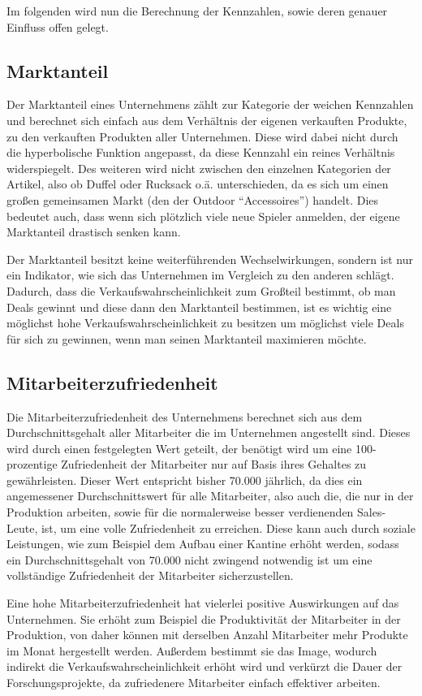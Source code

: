 Im folgenden wird nun die Berechnung der Kennzahlen, sowie deren genauer Einfluss offen gelegt.  

\subsection{Marktanteil} 
Der Marktanteil eines Unternehmens zählt zur Kategorie der weichen Kennzahlen und berechnet sich einfach aus dem Verhältnis der eigenen verkauften Produkte, zu den verkauften Produkten aller Unternehmen. Diese wird dabei nicht durch die hyperbolische Funktion angepasst, da diese Kennzahl ein reines Verhältnis widerspiegelt. Des weiteren wird nicht zwischen den einzelnen Kategorien der Artikel, also ob Duffel oder Rucksack o.ä. unterschieden, da es sich um einen großen gemeinsamen Markt (den der Outdoor \enquote{Accessoires}) handelt. Dies bedeutet auch, dass wenn sich plötzlich viele neue Spieler anmelden, der eigene Marktanteil drastisch senken kann. 

Der Marktanteil besitzt keine weiterführenden Wechselwirkungen, sondern ist nur ein Indikator, wie sich das Unternehmen im Vergleich zu den anderen schlägt. Dadurch, dass die Verkaufswahrscheinlichkeit zum Großteil bestimmt, ob man Deals gewinnt und diese dann den Marktanteil bestimmen, ist es wichtig eine möglichst hohe Verkaufswahrscheinlichkeit zu besitzen um möglichst viele Deals für sich zu gewinnen, wenn man seinen Marktanteil maximieren möchte. 

\subsection{Mitarbeiterzufriedenheit}
Die Mitarbeiterzufriedenheit des Unternehmens berechnet sich aus dem Durchschnittsgehalt aller Mitarbeiter die im Unternehmen angestellt sind. Dieses wird durch einen festgelegten Wert geteilt, der benötigt wird um eine 100-prozentige Zufriedenheit der Mitarbeiter nur auf Basis ihres Gehaltes zu gewährleisten. Dieser Wert entspricht bisher 70.000\€ jährlich, da dies ein angemessener Durchschnittswert für alle Mitarbeiter, also auch die, die nur in der Produktion arbeiten, sowie für die normalerweise besser verdienenden Sales-Leute, ist, um eine volle Zufriedenheit zu erreichen. Diese kann auch durch soziale Leistungen, wie zum Beispiel dem Aufbau einer Kantine erhöht werden, sodass ein Durchschnittsgehalt von 70.000\€ nicht zwingend notwendig ist um eine vollständige Zufriedenheit der Mitarbeiter sicherzustellen. 

Eine hohe Mitarbeiterzufriedenheit hat vielerlei positive Auswirkungen auf das Unternehmen. Sie erhöht zum Beispiel die Produktivität der Mitarbeiter in der Produktion, von daher können mit derselben Anzahl Mitarbeiter mehr Produkte im Monat hergestellt werden. Außerdem bestimmt sie das Image, wodurch indirekt die Verkaufswahrscheinlichkeit erhöht wird und verkürzt die Dauer der Forschungsprojekte, da zufriedenere Mitarbeiter einfach effektiver arbeiten. 
